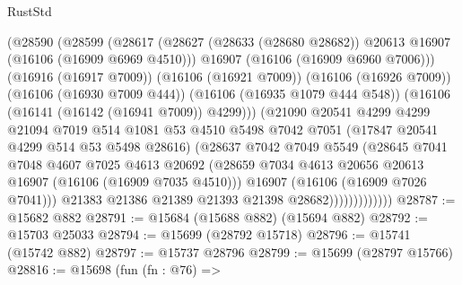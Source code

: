 \begin{lexlean}{RustStd}
\begin{coremodule}
                        (@28590
                          (@28599
                            (@28617
                              (@28627
                                (@28633 (@28680 @28682))
                                @20613
                                @16907
                                (@16106 (@16909 @6969 @4510)))
                              @16907
                              (@16106 (@16909 @6960 @7006)))
                            (@16916 (@16917 @7009))
                            (@16106 (@16921 @7009))
                            (@16106 (@16926 @7009))
                            (@16106 (@16930 @7009 @444))
                            (@16106 (@16935 @1079 @444 @548))
                            (@16106 (@16141 (@16142 (@16941 @7009)) @4299)))
                          (@21090
                            @20541
                            @4299
                            @4299
                            @21094
                            @7019
                            @514
                            @1081
                            @53
                            @4510
                            @5498
                            @7042
                            @7051
                            (@17847 @20541 @4299 @514 @53 @5498 @28616)
                            (@28637
                              @7042
                              @7049
                              @5549
                              (@28645
                                @7041
                                @7048
                                @4607
                                @7025
                                @4613
                                @20692
                                (@28659
                                  @7034
                                  @4613
                                  @20656
                                  @20613
                                  @16907
                                  (@16106 (@16909 @7035 @4510)))
                                @16907
                                (@16106 (@16909 @7026 @7041)))
                              @21383
                              @21386
                              @21389
                              @21393
                              @21398
                              @28682)))))))))))))
@28787 := @15682 @882
@28791 := @15684 (@15688 @882) (@15694 @882)
@28792 := @15703 @25033
@28794 := @15699 (@28792 @15718)
@28796 := @15741 (@15742 @882)
@28797 := @15737 @28796
@28799 := @15699 (@28797 @15766)
@28816 := @15698
    (fun (fn : @76) =>

\end{coremodule}
\end{lexlean}

